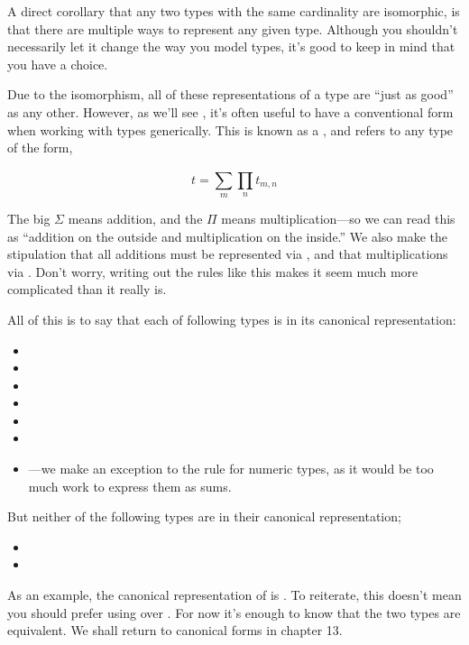 \documentclass[book.tex]{subfiles}
\begin{document}
A direct corollary that any two types with the same cardinality are isomorphic,
is that there are multiple ways to represent any given type. Although you
shouldn't necessarily let it change the way you model types, it's good to keep
in mind that you have a choice.

Due to the isomorphism, all of these representations of a type are ``just as
good'' as any other. However, as we'll see , it's
often useful to have a conventional form when working with types generically.
This  is known as a , and
refers to any type  of the form,

$$
{t = \sum_{m}^{}{\prod_{n}^{}{t_{m,n}}}}
$$

The big $\Sigma$ means addition, and
the $\Pi$ means multiplication---so we can read this as ``addition on the
outside and multiplication on the inside.'' We also make the stipulation that
all additions must be represented via , and that multiplications via
\ty{(,)}. Don't worry, writing out the rules like this makes it seem much more
complicated than it really is.

All of this is to say that each of following types is in its canonical
representation:

\begin{itemize}
  \item{\ty{()}}
  \item{}
  \item{}
  \item{}
  \item{}
  \item{}
  \item{---we make an exception to the rule for numeric
    types, as it would be too much work to express them as sums.}
\end{itemize}

But neither of the following types are in their canonical representation;

\begin{itemize}
  \item{}
  \item{}
\end{itemize}

As an example, the canonical representation of  is .
To reiterate, this doesn't mean you should prefer using  over
. For now it's enough to know that the two types are equivalent. We
shall return to canonical forms in chapter 13.

\end{document}
